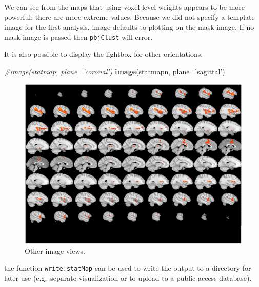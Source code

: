 \documentclass[]{article}
\newenvironment{Shaded}{\begin{snugshade}}{\end{snugshade}}
\newcommand{\KeywordTok}[1]{\textcolor[rgb]{0.13,0.29,0.53}{\textbf{#1}}}
\newcommand{\DataTypeTok}[1]{\textcolor[rgb]{0.13,0.29,0.53}{#1}}
\newcommand{\StringTok}[1]{\textcolor[rgb]{0.31,0.60,0.02}{#1}}
\newcommand{\CommentTok}[1]{\textcolor[rgb]{0.56,0.35,0.01}{\textit{#1}}}
\newcommand{\NormalTok}[1]{#1}
\begin{document}
We can see from the maps that using voxel-level weights appears to be
more powerful: there are more extreme values. Because we did not specify
a template image for the first analysis, image defaults to plotting on
the mask image. If no mask image is passed then \texttt{pbjClust} will
error.

It is also possible to display the lightbox for other orientations:

\begin{Shaded}
\begin{Highlighting}[]
\CommentTok{#image(statmap, plane='coronal')}
\KeywordTok{image}\NormalTok{(statmapn, }\DataTypeTok{plane=}\StringTok{'sagittal'}\NormalTok{)}
\end{Highlighting}
\end{Shaded}

\begin{figure}
\centering
\includegraphics{introduction_to_pbj_files/figure-latex/unnamed-chunk-8-1.pdf}
\caption{Other image views.}
\end{figure}

the function \texttt{write.statMap} can be used to write the output to a
directory for later use (e.g.~separate visualization or to upload to a
public access database).

\begin{Shaded}
\end{Shaded}
\end{document}
